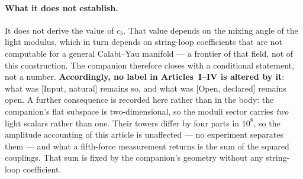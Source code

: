 \paragraph{What it does not establish.} It does not derive the value of $c_{b}$. That value depends on the mixing angle of the light modulus, which in turn depends on string-loop coefficients that are not computable for a general Calabi--Yau manifold --- a frontier of that field, not of this construction. The companion therefore closes with a conditional statement, not a number. \textbf{Accordingly, no label in Articles~I--IV is altered by it}: what was [Input, natural] remains so, and what was [Open, declared] remains open. A further consequence is recorded here rather than in the body: the companion's flat subspace is two-dimensional, so the moduli sector carries \emph{two} light scalars rather than one. Their towers differ by four parts in $10^{8}$, so the amplitude accounting of this article is unaffected --- no experiment separates them --- and what a fifth-force measurement returns is the sum of the squared couplings. That sum is fixed by the companion's geometry without any string-loop coefficient.


